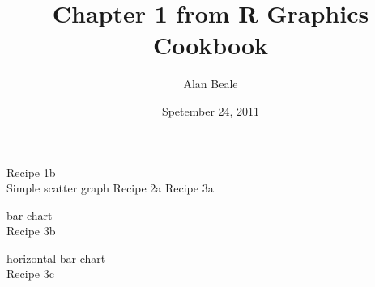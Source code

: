\documentclass[10pt]{article}
\title{Chapter 1 from R Graphics Cookbook }
\author{Alan Beale}
\date{Spetember 24, 2011}
\newcommand{\placeRecipe}[1]{\bigskip \noindent  \bigskip}
\newcommand{\testRecipe}[1]{\begin{figure} \centering  \end{figure}}
\begin{document}
\sffamily 
\maketitle



\Large{Recipe 1b}
\placeRecipe{recipe1b}
\\Simple scatter graph 
\Large{Recipe 2a}
\placeRecipe{recipe2a} 
\Large{Recipe 3a}
\testRecipe{recipe3a}
bar chart\\
\Large{Recipe 3b}
\testRecipe{recipe3b}
horizontal bar chart\\
\Large{Recipe 3c}
\testRecipe{recipe3c}
\placeRecipe{recipe3d}
\end{document}
